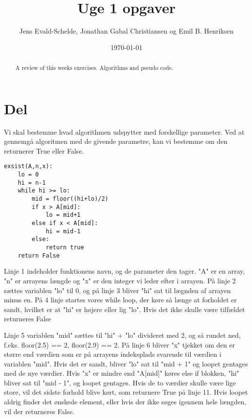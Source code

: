\documentclass{article}
\begin{document}
\title{Uge 1 opgaver}
\author{Jens Evald-Schelde, Jonathan Gabal Christiansen og Emil B. Henriksen}

\date{\today}
\maketitle
\renewcommand{\abstractname}{Abstract}
\begin{abstract}
	A review of this weeks exercises. Algorithms and pseudo code.
\end{abstract}

\section{Del}
Vi skal bestemme hvad algorithmen udspytter med forskellige parameter.\newline
Ved at gennemgå algoritmen med de givende parametre, kan vi bestemme om den returnerer True eller False.

\lstset{language=Python,numbers=left,stepnumber=1}
\begin{lstlisting}[frame=single]
exsist(A,n,x):
	lo = 0 
	hi = n-1 
	while hi >= lo:
		mid = floor((hi+lo)/2)
		if x > A[mid]:  
			lo = mid+1
		else if x < A[mid]:
			hi = mid-1
		else:
			return true
	return False
\end{lstlisting}

Linje 1 indeholder funktionens navn, og de parameter den tager. "A" er en array, "n" er arrayens længde og "x" er den integer vi leder efter i arrayen. På linje 2 sættes variablen "lo" til 0, og på linje 3 bliver "hi" sat til lægnden af arrayen minus en. På 4 linje startes vores while loop, der køre så længe at forholdet er sandt, hvilket er at "hi" er højere eller lig "lo". Hvis det ikke skulle være tilfældet returneres False
\newline

Linje 5 variablen "mid" sættes til "hi" + "lo" divideret med 2, og så rundet ned, f.eks. floor(2.5) == 2, floor(2.9) == 2. På linje 6 bliver "x" tjekket om den er større end værdien som er på arrayens indeksplads svarende til værdien i variablen "mid". Hvis det er sandt, bliver "lo" sat til "mid + 1" og loopet gentages med de nye værdier. Hvis "x" er mindre end "A[mid]" køres else if blokken, "hi" bliver sat til "mid - 1", og loopet gentages.\newline
Hvis de to værdier skulle være lige store, vil det sidste forhold blive kørt, som returnere True på linje 11. Hvis loopet aldrig finder det ønskede element, eller hvis der ikke søges igennem hele længden, vil der returneres False.
\newline
\end{document}
